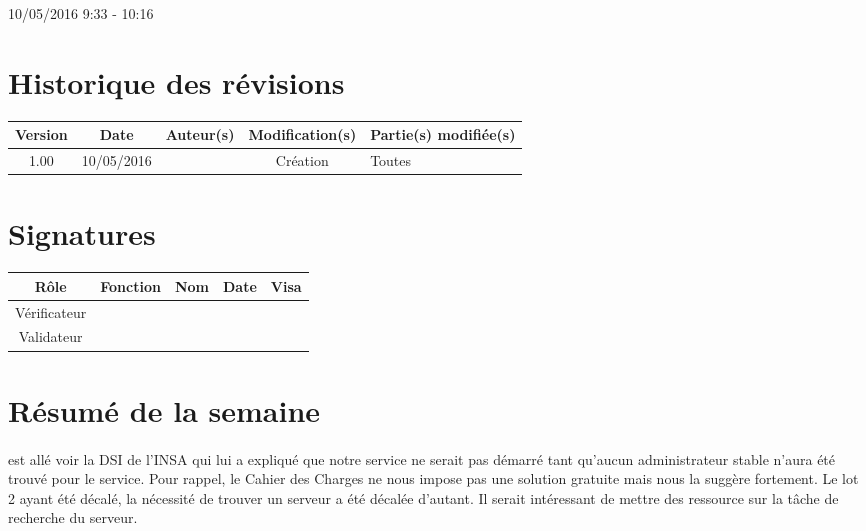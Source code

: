 \documentclass [a4paper] {article}
\begin{document}
\rhead{}

10/05/2016
\hfill   
\hfill 	9:33 - 10:16 				%



\section*{Historique des révisions}
\begin{center}
			\begin{tabular}{| c | c | c | c | p{4cm} |}
				\hline
				\rowcolor{Gray}
				Version & Date & Auteur(s) & Modification(s) & Partie(s) modifiée(s)		 \\
				\hline
				1.00 & 10/05/2016 & \Pierre & Création & Toutes \\
		\hline		
			\end{tabular}
		\end{center}

\section*{Signatures}

		\begin{center}
			\begin{tabular}{| c | c | c | c | p{4cm} |}
				\hline
				\rowcolor{Gray}
				Rôle & Fonction & Nom & Date & Visa		 \\
				\hline
				Vérificateur & \RQA & \Kafui & &  \\[30pt]
				\hline
				Validateur & \CP & \Sergi &  &  \\[30pt]	
				\hline
			\end{tabular}
		\end{center}


\section{Résumé de la semaine}
\paragraph*{}
\Sergi{} est allé voir la DSI de l'INSA qui lui a expliqué que notre service ne serait pas démarré tant qu'aucun administrateur stable n'aura été trouvé pour le service. Pour rappel, le Cahier des Charges ne nous impose pas une solution gratuite mais nous la suggère fortement. Le lot 2 ayant été décalé, la nécessité de trouver un serveur a été décalée d'autant. Il serait intéressant de mettre des ressource sur la tâche de recherche du serveur.
\end{document}

